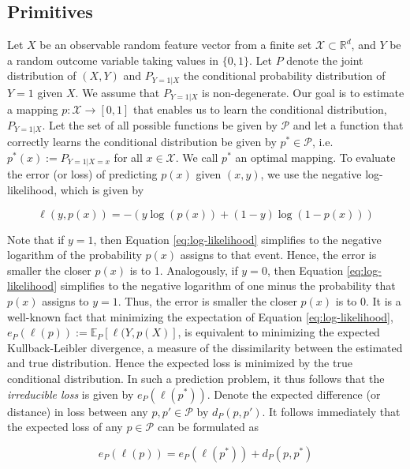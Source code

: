 \documentclass[11pt,a4paper]{article}
\theoremstyle{definition}
\begin{document}
\subsection{Primitives}
\label{subsec:primitives}
Let \(X\) be an observable random feature vector from a finite set \(\mathcal{X}\subset \mathbb{R}^{d}\), and \(Y\) be a random outcome variable taking values in \(\{0,1\}\). Let \(P\) denote the joint distribution of \((X,Y)\) and \(P_{Y=1|X}\) the conditional probability distribution of \(Y=1\) given \(X\). We assume that \(P_{Y=1|X}\) is non-degenerate. Our goal is to estimate a mapping \(p:\mathcal{X}\to[0,1]\) that enables us to learn the conditional distribution, \(P_{Y=1|X}\). Let the set of all possible functions be given by \(\mathcal{P}\) and let a function that correctly learns the conditional distribution be given by \(p^{*}\in\mathcal{P}\), i.e. \(p^{*}(x):=P_{Y=1|X=x}\) for all \(x\in\mathcal{X}\). We call \(p^{*}\) an optimal mapping. To evaluate the error (or loss) of predicting \(p(x)\) given \((x,y)\), we use the negative log-likelihood, which is given by


\begin{equation}
\label{eq:log-likelihood}
\ell(y,p(x))=-\left(y\log(p(x))+(1-y)\log(1-p(x))\right)
\end{equation}

Note that if \(y=1\), then Equation \eqref{eq:log-likelihood} simplifies to the negative logarithm of the probability \(p(x)\) assigns to that event. Hence, the error is smaller the closer \(p(x)\) is to 1. Analogously, if \(y=0\), then Equation \eqref{eq:log-likelihood} simplifies to the negative logarithm of one minus the probability that \(p(x)\) assigns to \(y=1\). Thus, the error is smaller the closer \(p(x)\) is to 0. It is a well-known fact that minimizing the expectation of Equation \eqref{eq:log-likelihood}, \(e_P(\ell(p)):=\mathbb{E}_P[\ell(Y,p(X)]\), is equivalent to minimizing the expected Kullback-Leibler divergence, a measure of the dissimilarity between the estimated and true distribution. Hence the expected loss is minimized by the true conditional distribution. In such a prediction problem, it thus follows that the \emph{irreducible loss} is given by \(e_P(\ell(p^*))\). Denote the expected difference (or distance) in loss between any \(p,p'\in\mathcal{P}\) by \(d_P(p,p')\). It follows immediately that the expected loss of any \(p\in\mathcal{P}\) can be formulated as

\begin{equation}
e_P(\ell(p))=e_P(\ell(p^{*}))+d_P(p,p^{*})
\end{equation}
\end{document}
